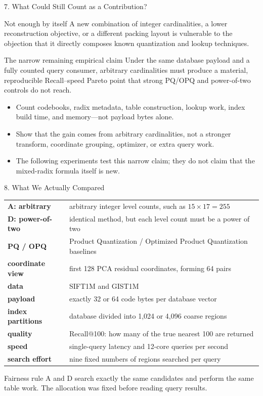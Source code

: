 \documentclass[aspectratio=169]{beamer}
\begin{document}
\begin{frame}{7. What Could Still Count as a Contribution?}
\small
\begin{block}{Not enough by itself}
A new combination of integer cardinalities, a lower reconstruction objective,
or a different packing layout is vulnerable to the objection that it directly
composes known quantization and lookup techniques.
\end{block}
\begin{alertblock}{The narrow remaining empirical claim}
Under the same database payload and a fully counted query consumer, arbitrary
cardinalities must produce a material, reproducible Recall--speed Pareto point
that strong PQ/OPQ and power-of-two controls do not reach.
\end{alertblock}
\begin{itemize}
  \item Count codebooks, radix metadata, table construction, lookup work,
  index build time, and memory---not payload bytes alone.
  \item Show that the gain comes from arbitrary cardinalities, not a stronger
  transform, coordinate grouping, optimizer, or extra query work.
  \item The following experiments test this narrow claim; they do not claim
  that the mixed-radix formula itself is new.
\end{itemize}
\end{frame}

\begin{frame}{8. What We Actually Compared}
\footnotesize
\begin{tabularx}{\textwidth}{>{\bfseries}p{} X}
A: arbitrary & arbitrary integer level counts, such as \(15\times17=255\)\\
D: power-of-two & identical method, but each level count must be a power of two\\
PQ / OPQ & Product Quantization / Optimized Product Quantization baselines\\
coordinate view & first 128 PCA residual coordinates, forming 64 pairs\\
data & SIFT1M and GIST1M\\
payload & exactly 32 or 64 code bytes per database vector\\
index partitions & database divided into 1,024 or 4,096 coarse regions\\
quality & Recall@100: how many of the true nearest 100 are returned\\
speed & single-query latency and 12-core queries per second\\
search effort & nine fixed numbers of regions searched per query\\
\end{tabularx}
\begin{block}{Fairness rule}
A and D search exactly the same candidates and perform the same table work.
The allocation was fixed before reading query results.
\end{block}
\end{frame}
\end{document}
